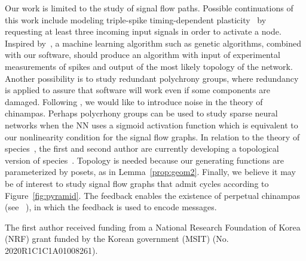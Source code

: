 \documentclass[a4paper]{article}\usepackage[english]{babel}
\theoremstyle{definition}
\begin{document}
 Our work is limited to the study of signal flow paths. Possible continuations of this work include modeling triple-spike timing-dependent plasticity~\cite{triple, tspike,twspike,twtspike}  by requesting at least three incoming input signals in order to activate a node. Inspired by~\cite{beyond},  a machine learning algorithm such as genetic algorithms, combined with our software, should produce an algorithm with input of experimental measurements of spikes and output of the most likely topology of the network. Another possibility is to study redundant polychrony groups, where  redundancy is applied to assure that software will work even if some components are damaged. Following \cite{noise}, we would like to introduce noise in the theory of chinampas. Perhaps polycrhony groups can be used to study sparse neural networks \cite{sparse1, sparse2,sparse3,sparse4, sparse5} when the NN uses a sigmoid activation function which is equivalent to our nonlinearity condition for the signal flow graphs. In relation to  the theory of species~\cite{gf, species}, the first and second author are currently developing a topological version of species~\cite{poset}. Topology is needed because our generating functions are parameterized by posets, as in Lemma~\ref{prop:geom2}. Finally, we believe it may be of interest to study signal flow graphs that admit cycles according to Figure~\ref{fig:pyramid}. The feedback enables the existence of perpetual chinampas (see ~\cite{chaos}), in which the feedback is used to encode messages.
\vspace{6pt} 



{The first author  received funding from 
a National Research Foundation of Korea (NRF) grant funded by the Korean government (MSIT) (No. 2020R1C1C1A01008261).}
\end{document}
